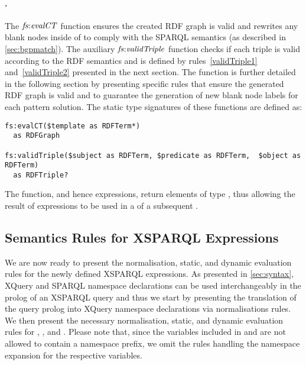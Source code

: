 \paragraph{.}
\label{sec:fs:evalCT}
%
The $\mathit{fs{:}evalCT}$ function ensures the created RDF graph is valid and rewrites any blank nodes inside of
 to comply with the SPARQL semantics (as described in \cref{sec:bgpmatch}).  The auxiliary
$\mathit{fs{:}validTriple}$ function checks if each triple is valid according to the RDF semantics and is defined by
rules~\eqref{validTriple1} and~\eqref{validTriple2} presented in the next section.
%
The  function is further detailed in the following section by presenting specific rules that
ensure the generated \ac{RDF} graph is valid and to guarantee the generation of new blank node labels for each pattern
solution.
%
The static type signatures of these functions are defined as:
%
{\small
\begin{verbatim}
fs:evalCT($template as RDFTerm*)
  as RDFGraph

fs:validTriple($subject as RDFTerm, $predicate as RDFTerm,  $object as RDFTerm)
  as RDFTriple?
\end{verbatim}
}
%
\noindent The  function, and hence \CONSTRUCT expressions, return elements of type
, thus allowing the result of \CONSTRUCT expressions to be used in a \DatasetClause of a subsequent
\SparqlForClause.

\subsection{Semantics Rules for XSPARQL Expressions}
\label{sec:new-semantics-rules}

We are now ready to present the normalisation, static, and dynamic evaluation rules for the newly defined XSPARQL
expressions.
%
As presented in \cref{sec:syntax}, XQuery and SPARQL namespace declarations can be used interchangeably in the
prolog of an XSPARQL query and thus we start by presenting the translation of the query prolog into XQuery namespace
declarations via normalisations rules.
%
We then present the necessary normalisation, static, and dynamic evaluation rules for ,
, and .
%
Please note that, since the variables included in  and  are not allowed to contain a
namespace prefix, we omit the rules handling the namespace expansion for the respective variables.


